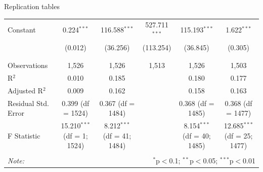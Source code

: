 \documentclass{beamer}
\begin{document}
\begin{frame}{Replication tables}
\begin{table}[!htbp]
{\begin{tabular}{@{\extracolsep{5pt}}lccccc}
 Constant & 0.224$^{***}$ & 116.588$^{***}$ & 527.711$^{***}$ & 115.193$^{***}$ & 1.622$^{***}$ \\ 
  & (0.012) & (36.256) & (113.254) & (36.845) & (0.305) \\ 
  & & & & & \\ 
\hline \\[-1.8ex] 
Observations & 1,526 & 1,526 & 1,513 & 1,526 & 1,503 \\ 
R$^{2}$ & 0.010 & 0.185 &  & 0.180 & 0.177 \\ 
Adjusted R$^{2}$ & 0.009 & 0.162 &  & 0.158 & 0.163 \\ 
Residual Std. Error & 0.399 (df = 1524) & 0.367 (df = 1484) &  & 0.368 (df = 1485) & 0.368 (df = 1477) \\ 
F Statistic & 15.210$^{***}$ (df = 1; 1524) & 8.212$^{***}$ (df = 41; 1484) &  & 8.154$^{***}$ (df = 40; 1485) & 12.685$^{***}$ (df = 25; 1477) \\ 
\hline 
\hline \\[-1.8ex] 
\textit{Note:}  & \multicolumn{5}{r}{$^{*}$p$<$0.1; $^{**}$p$<$0.05; $^{***}$p$<$0.01} \\ 
\end{tabular} }
\end{table} 
\end{frame}
\end{document}
